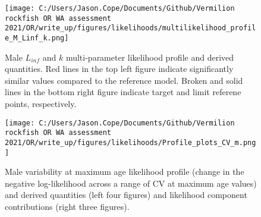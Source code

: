 \documentclass[11pt,
  english,
  a4paper,
]{article}
\begin{document}
\tagmcend\tagstructend


\begin{figure}
\centering
\texttt{[image: C:/Users/Jason.Cope/Documents/Github/Vermilion rockfish OR WA assessment 2021/OR/write\_up/figures/likelihoods/multilikelihood\_profile\_M\_Linf\_k.png]}
\caption{Male {\(L_{inf}\)\leavevmode\tagmcend\tagstructend} and {\(k\)\leavevmode\tagmcend\tagstructend} multi-parameter likelihood profile and derived quantities. Red lines in the top left figure indicate significantly similar values compared to the reference model. Broken and solid lines in the bottom right figure indicate target and limit referene points, respectively.\label{fig:Linf_k_m-profile}}
\end{figure}

\tagmcend\tagstructend


\begin{figure}
\centering
\texttt{[image: C:/Users/Jason.Cope/Documents/Github/Vermilion rockfish OR WA assessment 2021/OR/write\_up/figures/likelihoods/Profile\_plots\_CV\_m.png]}
\caption{Male variability at maximum age likelihood profile (change in the negative log-likelihood across a range of CV at maximum age values) and derived quantities (left four figures) and likelihood component contributions (right three figures).\label{fig:CVold_m-profile-combo}}
\end{figure}

\tagmcend\tagstructend

\end{document}
